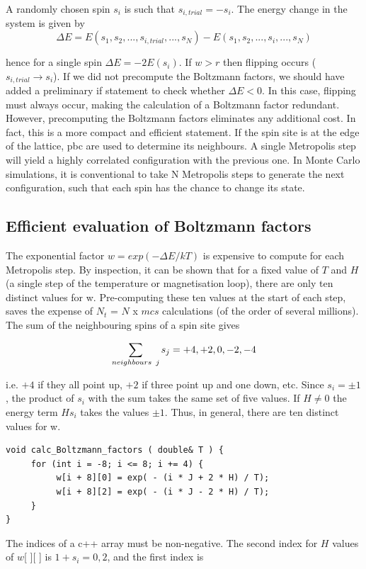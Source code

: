 \documentclass[a4paper]{article}
\begin{document}
A randomly chosen spin $s_i$ is such that $s_{i,trial} = -s_i$. The energy change in the system is given by
\begin{equation}
\Delta E = E(s_1, s_2,..., s_{i,trial}, ...,s_N) - E(s_1,s_2, ...,s_i, ..., s_N)
\end{equation}

hence for a single spin $\Delta E = -2E(s_i)$. If $w > r$ then flipping occurs ( $s_{i,trial} \rightarrow s_i$). If we did not precompute the Boltzmann factors, we should have added a preliminary if statement to check whether $\Delta E <0 $. In this case, flipping must always occur, making the calculation of a Boltzmann factor redundant. However, precomputing the Boltzmann factors eliminates any additional cost. In fact, this is a more compact and efficient statement. If the spin site is at the edge of the lattice, pbc are used to determine its neighbours. A single Metropolis step will yield a highly correlated configuration with the previous one. In Monte Carlo simulations, it is conventional to take N Metropolis steps to generate the next configuration, such that each spin has the chance to change its state. 
 
\subsection{Efficient evaluation of Boltzmann factors}

The exponential factor $w = exp(-\Delta E/kT)$ is expensive to compute for each Metropolis step. By inspection, it can be shown that for a fixed value of $T$ and $H$ (a single step of the temperature or magnetisation loop), there are only ten distinct values for w. Pre-computing these ten values at the start of each step, saves the expense of $N_t$ = $N$ x $mcs$ calculations (of the order of several millions). The sum of the neighbouring spins of a spin site gives 

\begin{equation}
\sum_{\substack{ neighbours\hspace{1.5mm} j}} s_j = +4,+2,0,-2,-4
\end{equation}

i.e. $+4$ if they all point up, $+2$ if three point up and one down, etc. Since  $s_i = \pm 1$, the product of $s_i$ with the sum takes the same set of five values. If $H \neq 0$ the energy term $H s_i$ takes the values $\pm 1$. Thus, in general, there are ten distinct values for w.
\begin{verbatim}
void calc_Boltzmann_factors ( double& T ) {
     for (int i = -8; i <= 8; i += 4) {
          w[i + 8][0] = exp( - (i * J + 2 * H) / T);
          w[i + 8][2] = exp( - (i * J - 2 * H) / T);
     }
}
\end{verbatim}
The indices of a c\scriptsize{++} \normalsize array must be non-negative. The second index for $H$ values of $w$[ ][ ] is $1+s_i = 0,2$, and the first index is
\end{document}
